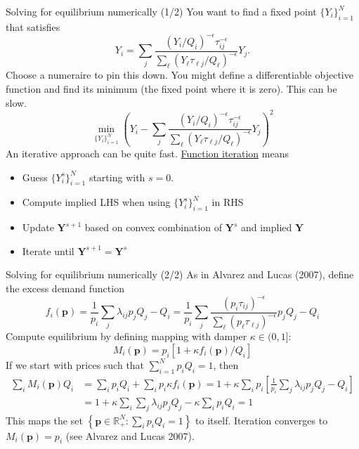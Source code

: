 \documentclass[10pt,notes=hide]{beamer}
\begin{document}
\begin{frame}{Solving for equilibrium numerically (1/2)}
You want to find a fixed point $\{Y_i\}_{i=1}^{N}$ that satisfies
$$
Y_i
=
\sum_j \frac{\left(Y_i/Q_i\right)^{-\epsilon} \tau_{ij}^{-\epsilon}}{\sum_{\ell} \left(Y_{\ell} \tau_{\ell j} / Q_{\ell}\right)^{-\epsilon}} Y_j
.$$
Choose a numeraire to pin this down.
You might define a differentiable objective function and find its minimum (the fixed point where it is zero).
This can be slow.
$$
\min_{\{Y_{i}\}_{i=1}^{N}}
\left(Y_i
-
\sum_j \frac{\left(Y_i/Q_i\right)^{-\epsilon} \tau_{ij}^{-\epsilon}}{\sum_{\ell} \left(Y_{\ell} \tau_{\ell j} / Q_{\ell}\right)^{-\epsilon}} Y_j
\right)^2
$$
An iterative approach can be quite fast. \href{https://raw.githack.com/AEM7130/class-repo/master/lecture-notes/04-optimization/04-optimization.html\#40}{Function iteration} means
\begin{itemize}
\item Guess $\{Y_{i}^{s}\}_{i=1}^{N}$ starting with $s=0$.
\item Compute implied LHS when using $\{Y_{i}^{s}\}_{i=1}^{N}$ in RHS
\item Update $\mathbf{Y}^{s+1}$ based on convex combination of $\mathbf{Y}^{s}$ and implied $\mathbf{Y}$
\item Iterate until $\mathbf{Y}^{s+1} = \mathbf{Y}^{s}$
\end{itemize}
\end{frame}
\begin{frame}{Solving for equilibrium numerically (2/2)}
As in Alvarez and Lucas (2007), define the excess demand function
$$
f_i(\mathbf{p}) 
=
\frac{1}{p_i} \sum_{j} \lambda_{ij} p_j Q_j - Q_i
=
\frac{1}{p_i} \sum_{j}
\frac{\left(p_i\tau_{ij}\right)^{-\epsilon}}{\sum_{\ell} \left(p_{\ell} \tau_{\ell j}\right)^{-\epsilon}}
p_j Q_j - Q_i
$$
Compute equilibrium by defining mapping with damper $\kappa \in (0,1]$:
$$M_i(\mathbf{p}) = p_i \left[1 + \kappa f_i(\mathbf{p}) / Q_{i}\right]$$
If we start with prices such that $\sum_{i=1}^{N} p_i Q_i = 1$, then
\begin{align*}
\sum_{i} M_i(\mathbf{p}) Q_i
&=
\sum_{i} p_i Q_i + \sum_{i} p_i \kappa f_i(\mathbf{p})
=
1 + \kappa \sum_{i} p_i \left[\frac{1}{p_i} \sum_{j} \lambda_{ij} p_j Q_j - Q_i\right]
\\
&=
1 + \kappa \sum_{i} \sum_{j} \lambda_{ij} p_j Q_j - \kappa \sum_{i} p_i  Q_i
=
1
\end{align*}
This maps the set $\left\{\mathbf{p} \in \mathbb{R}^{N}_{+}: \sum_{i} p_i Q_i = 1\right\}$ to itself.
Iteration converges to $M_{i}(\mathbf{p}) = p_i$ (see Alvarez and Lucas 2007).
\end{frame}
\end{document}

